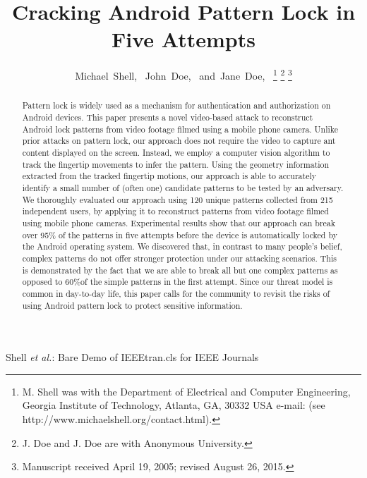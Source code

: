 \documentclass[journal]{IEEEtran}
\begin{document}
\title{Cracking Android Pattern Lock in Five Attempts}


\author{Michael~Shell,~
        John~Doe,~
        and~Jane~Doe,~%
\thanks{M. Shell was with the Department
of Electrical and Computer Engineering, Georgia Institute of Technology, Atlanta,
GA, 30332 USA e-mail: (see http://www.michaelshell.org/contact.html).}%
\thanks{J. Doe and J. Doe are with Anonymous University.}%
\thanks{Manuscript received April 19, 2005; revised August 26, 2015.}}



%
{Shell \MakeLowercase{\textit{et al.}}: Bare Demo of IEEEtran.cls for IEEE Journals}

\maketitle

\begin{abstract}
    Pattern lock is widely used as a mechanism for authentication and authorization on Android devices. This paper presents a novel video-based attack to reconstruct Android lock patterns from video footage filmed using a mobile phone camera. Unlike prior attacks on pattern lock, our approach does not require the video to capture ant content displayed on the screen. Instead, we employ a computer vision algorithm to track the fingertip movements to infer the pattern. Using the geometry information extracted from the tracked fingertip motions, our approach is able to accurately identify a small number of (often one) candidate patterns to be tested by an adversary. We thoroughly evaluated our approach using 120 unique patterns collected from 215 independent users, by applying it to reconstruct patterns from video footage filmed using mobile phone cameras. Experimental results show that our approach can break over 95\% of the patterns in five attempts before the device is automatically locked by the Android operating system. We discovered that, in contrast to many people's belief, complex patterns do not offer stronger protection under our attacking scenarios. This is demonstrated by the fact that we are able to break all but one complex patterns as opposed to 60\%of the simple patterns in the first attempt. Since our threat model is common in day-to-day life, this paper calls for the community to revisit the risks of using Android pattern lock to protect sensitive information.
\end{abstract}
\end{document}
